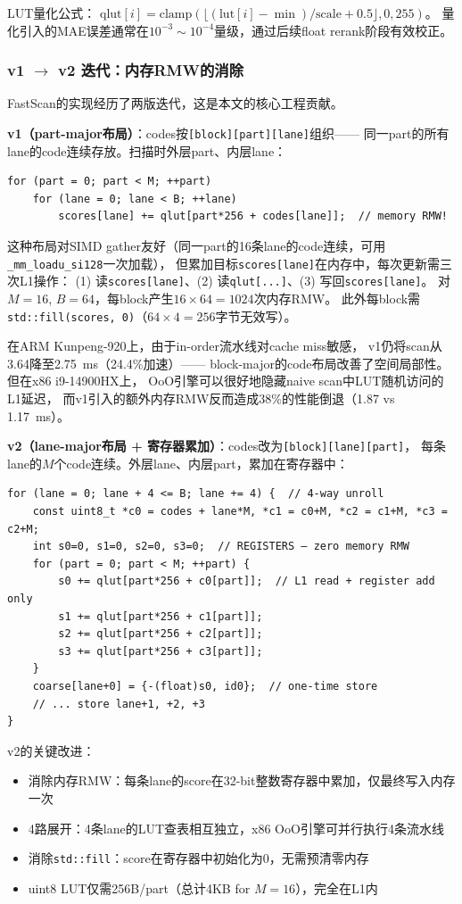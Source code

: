 \documentclass[11pt,a4paper]{article}
\begin{document}
LUT量化公式：
$\text{qlut}[i] = \text{clamp}(\lfloor(\text{lut}[i] - \min)/\text{scale} + 0.5\rfloor, 0, 255)$。
量化引入的MAE误差通常在$10^{-3}\sim 10^{-4}$量级，通过后续float rerank阶段有效校正。

\subsubsection{v1 $\to$ v2 迭代：内存RMW的消除}

FastScan的实现经历了两版迭代，这是本文的核心工程贡献。

\textbf{v1（part-major布局）}：codes按\texttt{[block][part][lane]}组织——
同一part的所有lane的code连续存放。扫描时外层part、内层lane：
\begin{lstlisting}
for (part = 0; part < M; ++part)
    for (lane = 0; lane < B; ++lane)
        scores[lane] += qlut[part*256 + codes[lane]];  // memory RMW!
\end{lstlisting}
这种布局对SIMD gather友好（同一part的16条lane的code连续，可用\texttt{\_mm\_loadu\_si128}一次加载），
但累加目标\texttt{scores[lane]}在内存中，每次更新需三次L1操作：
(1) 读\texttt{scores[lane]}、(2) 读\texttt{qlut[...]}、(3) 写回\texttt{scores[lane]}。
对$M=16$, $B=64$，每block产生$16\times 64=1024$次内存RMW。
此外每block需\texttt{std::fill(scores, 0)}（$64\times 4=256$字节无效写）。

在ARM Kunpeng-920上，由于in-order流水线对cache miss敏感，
v1仍将scan从3.64降至2.75~ms（24.4\%加速）——
block-major的code布局改善了空间局部性。但在x86 i9-14900HX上，
OoO引擎可以很好地隐藏naive scan中LUT随机访问的L1延迟，
而v1引入的额外内存RMW反而造成38\%的性能倒退（1.87 vs 1.17~ms）。

\textbf{v2（lane-major布局 + 寄存器累加）}：codes改为\texttt{[block][lane][part]}，
每条lane的$M$个code连续。外层lane、内层part，累加在寄存器中：
\begin{lstlisting}
for (lane = 0; lane + 4 <= B; lane += 4) {  // 4-way unroll
    const uint8_t *c0 = codes + lane*M, *c1 = c0+M, *c2 = c1+M, *c3 = c2+M;
    int s0=0, s1=0, s2=0, s3=0;  // REGISTERS — zero memory RMW
    for (part = 0; part < M; ++part) {
        s0 += qlut[part*256 + c0[part]];  // L1 read + register add only
        s1 += qlut[part*256 + c1[part]];
        s2 += qlut[part*256 + c2[part]];
        s3 += qlut[part*256 + c3[part]];
    }
    coarse[lane+0] = {-(float)s0, id0};  // one-time store
    // ... store lane+1, +2, +3
}
\end{lstlisting}
v2的关键改进：
\begin{itemize}[nosep]
    \item 消除内存RMW：每条lane的score在32-bit整数寄存器中累加，仅最终写入内存一次
    \item 4路展开：4条lane的LUT查表相互独立，x86 OoO引擎可并行执行4条流水线
    \item 消除\texttt{std::fill}：score在寄存器中初始化为0，无需预清零内存
    \item uint8 LUT仅需256B/part（总计4KB for $M=16$），完全在L1内
\end{itemize}
\end{document}
